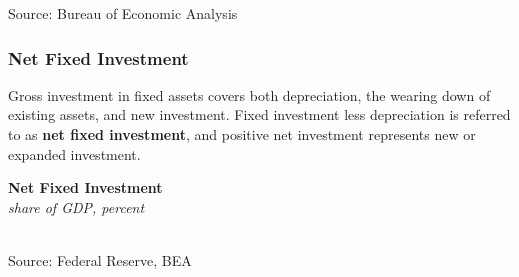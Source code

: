 \documentclass{report}
\makeatletter
\newcommand{\tbllink}[1]{\href{https://raw.githubusercontent.com/bdecon/US-chartbook/master/chartbook/data/#1}{\faTable}}
\newcommand*\short[1]{\expandafter\@gobbletwo\number\numexpr#1\relax}
\newcommand{\absnode}[3]{\node[below right, align=left] at (axis cs: #1,#2) {#3};}
\newcommand{\shdateaxisticks}{
		date coordinates in=x, axis line style={draw=none},
		xmax={2023-02-15},
		max space between ticks=40,	    
		xtick={{1990-01-01}, {1995-01-01}, {2000-01-01}, 
			{2005-01-01}, {2010-01-01}, {2015-01-01}, {2020-01-01}},
		minor xtick={},
		enlarge y limits={0.06}, enlarge x limits={0.01},
		}
\newcommand{\bbar}[2]{extra #1 ticks = {{#2}}, extra #1 tick labels = ,
		extra #1 tick style = {grid=major, grid style={thick, black!25}},}
\newcommand{\stdline}[4]{\addplot[very thick, no markers, color=#1] 
		table [x=#2, y=#3, col sep=comma] {#4};	}
\newcommand{\rbars}{
		\fill[color=black!10] (axis cs:{1990-07-01},\pgfkeysvalueof{/pgfplots/ymin}) rectangle 
			(axis cs:{1991-03-01}, \pgfkeysvalueof{/pgfplots/ymax});
		\fill[color=black!10] (axis cs:{2007-12-01},\pgfkeysvalueof{/pgfplots/ymin}) rectangle 
			(axis cs:{2009-07-01}, \pgfkeysvalueof{/pgfplots/ymax});
		\fill[color=black!10] (axis cs:{2001-03-01},\pgfkeysvalueof{/pgfplots/ymin}) rectangle 
			(axis cs:{2001-11-01}, \pgfkeysvalueof{/pgfplots/ymax});
		\fill[color=black!10] (axis cs:{2020-02-01},\pgfkeysvalueof{/pgfplots/ymin}) rectangle 
			(axis cs:{2020-05-01}, \pgfkeysvalueof{/pgfplots/ymax});}
\makeatother
\begin{document}
{\begin{minipage}{0.76\textwidth}
\footnotesize{Source: Bureau of Economic Analysis} \hfill \tbllink{inv.csv} 
\end{minipage}
\newpage
\begin{minipage}{0.76\textwidth}
\subsubsection*{Net Fixed Investment}
\vspace{-1.5mm}
\small Gross investment in fixed assets covers both depreciation, the wearing down of existing assets, and new investment. Fixed investment less depreciation is referred to as \textbf{net fixed investment}, and positive net investment represents new or expanded investment. 

\begin{minipage}{0.445\textwidth}
\small 
\end{minipage} \hfill
\begin{minipage}{0.49\textwidth}
\normalsize \textbf{Net Fixed Investment}\\
\footnotesize{\textit{share of GDP, percent}}\\
\hspace*{-2mm} \\
\footnotesize{Source: Federal Reserve, BEA} \hfill \tbllink{z1_nfi.csv}
\end{minipage}

\small 
\vspace{0.5mm}


\end{minipage}}
\end{document}
